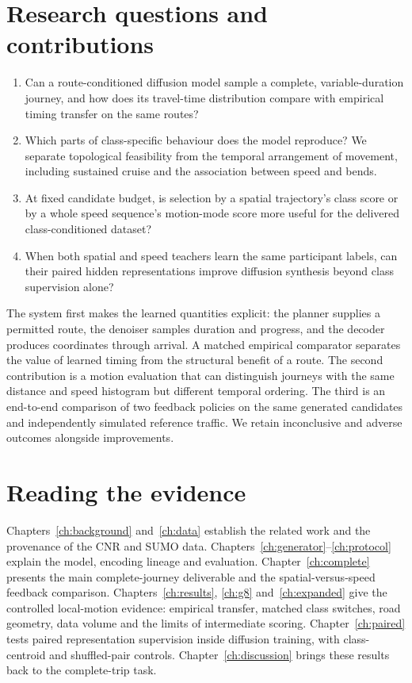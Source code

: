 \section{Research questions and contributions}
\begin{enumerate}
\item Can a route-conditioned diffusion model sample a complete, variable-duration journey, and how does its travel-time distribution compare with empirical timing transfer on the same routes?
\item Which parts of class-specific behaviour does the model reproduce? We separate topological feasibility from the temporal arrangement of movement, including sustained cruise and the association between speed and bends.
\item At fixed candidate budget, is selection by a spatial trajectory's class score or by a whole speed sequence's motion-mode score more useful for the delivered class-conditioned dataset?
\item When both spatial and speed teachers learn the same participant labels, can their paired hidden representations improve diffusion synthesis beyond class supervision alone?
\end{enumerate}
The system first makes the learned quantities explicit: the planner supplies a permitted route, the denoiser samples duration and progress, and the decoder produces coordinates through arrival. A matched empirical comparator separates the value of learned timing from the structural benefit of a route. The second contribution is a motion evaluation that can distinguish journeys with the same distance and speed histogram but different temporal ordering. The third is an end-to-end comparison of two feedback policies on the same generated candidates and independently simulated reference traffic. We retain inconclusive and adverse outcomes alongside improvements.

\section{Reading the evidence}
Chapters~\ref{ch:background} and~\ref{ch:data} establish the related work and the provenance of the CNR and SUMO data. Chapters~\ref{ch:generator}--\ref{ch:protocol} explain the model, encoding lineage and evaluation. Chapter~\ref{ch:complete} presents the main complete-journey deliverable and the spatial-versus-speed feedback comparison. Chapters~\ref{ch:results}, \ref{ch:g8} and~\ref{ch:expanded} give the controlled local-motion evidence: empirical transfer, matched class switches, road geometry, data volume and the limits of intermediate scoring. Chapter~\ref{ch:paired} tests paired representation supervision inside diffusion training, with class-centroid and shuffled-pair controls. Chapter~\ref{ch:discussion} brings these results back to the complete-trip task.
